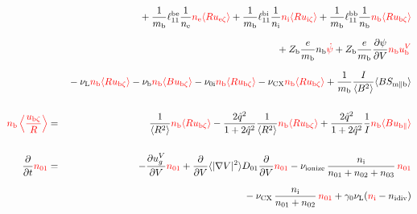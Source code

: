 \documentclass[11pt]{article}
\def\r#1{{\rm#1}}
\def\ave#1{\left\langle#1\right\rangle}
\def\aves#1{\langle#1\rangle}
\def\dd#1#2{\frac{\partial #1}{\partial #2}}
\def\para{\parallel}
\def\ddV{\frac{\partial}{\partial V}}
\def\mi{m_\r{i}}
\def\mb{m_\r{b}}
\def\nee{n_\r{e}}
\def\ni{n_\r{i}}
\def\nb{n_\r{b}}
\def\nna{n_{01}}
\def\nnb{n_{02}}
\def\nnc{n_{03}}
\def\Te{T_\r{e}}
\def\Zi{Z_\r{i}}
\def\Zb{Z_\r{b}}
\def\uezt{u_{\r{e}\zeta}}
\def\uizt{u_{\r{i}\zeta}}
\def\ubzt{u_{\r{b}\zeta}}
\def\uepara{u_{\r{e}\para}}
\def\ubpara{u_{\r{b}\para}}
\def\qhatepara{\hat{q}_{\r{e}\para}}
\def\qhatipara{\hat{q}_{\r{i}\para}}
\def\ubV{u_\r{b}^V}
\def\ugV{u_{g}^V}
\def\bri{\aves{B^2}\aves{R^2} - I^2}
\def\ddt{\frac{\partial}{\partial t}}
\def\De{D_\r{e}}
\def\nuni{\nu_\r{0i}}
\def\nuL{\nu_\r{L}}
\def\nuCX{\nu_\r{CX}}
\def\nuion{\nu_\r{ionize}}
\def\nub{\nu_\r{b}}
\def\nidiv{n_\r{idiv}}
\def\nuOL{\nu_\r{OL}}
\def\red#1{\textcolor{red}{#1}}
\begin{document}
\begin{eqnarray}
\nonumber\\[2.5mm]&&{}
%
  + \frac{1}{\mb} \ell_{11}^\r{be} \frac{1}{\nee} \red{\nee \aves{R \uezt}}
  + \frac{1}{\mb} \ell_{11}^\r{bi} \frac{1}{\ni} \red{\ni \aves{R \uizt}}
  + \frac{1}{\mb} \ell_{11}^\r{bb} \frac{1}{\nb} \red{\nb \aves{R \ubzt}}
\nonumber\\[2.5mm]&&{}
%
%
  + \Zb \frac{e}{\mb}              \nb \red{\dot{\psi}}
%
  + \Zb \frac{e}{\mb} \dd{\psi}{V} \red{\nb \ubV}
%
\nonumber\\[2.5mm]&&{}
%
  - \nuL  \red{\nb \aves{R \ubzt}}
%
  - \nub  \red{\nb \aves{B \ubzt}}
%
  - \nuni \red{\nb \aves{R \ubzt}}
%
  - \nuCX \red{\nb \aves{R \ubzt}}
%
%
  + \frac{1}{\mb} \frac{I}{\aves{B^2}} \aves{B S_{\r{m}\para\r{b}}}
%
\\[5mm]
    \red{\nb \ave{\frac{\ubzt}{R}}} &=&
%
    \frac{1}{\aves{R^2}} \red{\nb \aves{R\ubzt}}
%
  - \frac{2\hat{q}^2}{1+2\hat{q}^2} \frac{1}{\aves{R^2}}\red{\nb\aves{R\ubzt}}
%
  + \frac{2\hat{q}^2}{1+2\hat{q}^2} \frac{1}{I}\red{\nb \aves{B\ubpara}}
\\[5mm]
  \ddt \red{\nna} &=& 
%
  - \dd{\ugV}{V} \red{\nna}
%
  + \ddV \aves{|\nabla V|^2} D_{01} \ddV \red{\nna}
%
  - \nuion\, \frac{\ni}{\nna + \nnb + \nnc}\, \red{\nna}
%
\nonumber\\[2.5mm]&&{}
  - \nuCX\, \frac{\ni}{\nna + \nnb}\, \red{\nna}
%
  + \gamma_0 \nuL (\red{\ni} - \nidiv)

\end{eqnarray}
\end{document}
